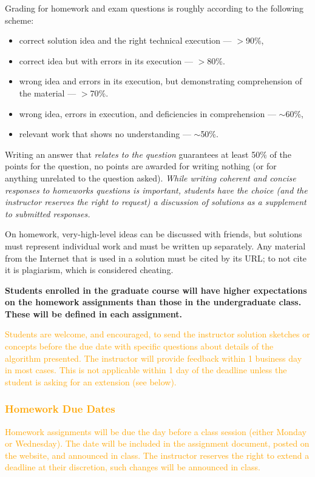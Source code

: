 \documentclass[12pt]{scrartcl}
\newcommand{\add}[1]{\textcolor{orange}{#1}}
\begin{document}
Grading for homework and exam questions is roughly according to the following scheme:
\begin{itemize}
\item correct solution idea and the right technical execution --- $>$90\%, 
\item correct idea but with errors in its execution --- $>$80\%. 
\item wrong idea and errors in its execution, but demonstrating comprehension of the material --- $>$70\%. 
\item wrong idea, errors in execution, and deficiencies in comprehension --- $\sim$60\%, 
\item relevant work that shows no understanding --- $\sim$50\%.
\end{itemize}
Writing an answer that \emph{relates to the question} guarantees at least 50\% of the points for the question, 
no points are awarded for writing nothing (or for anything unrelated to the question asked).
\emph{While writing coherent and concise responses to homeworks questions is important, 
students have the choice (and the instructor reserves the right to request) a discussion of solutions as a supplement to submitted responses. }

On homework, very-high-level ideas can be discussed with friends, but solutions must represent individual work and must be written up separately. 
Any material from the Internet that is used in a solution must be cited by its URL; to not cite it is plagiarism, which is considered cheating.

\textbf{Students enrolled in the graduate course will have higher expectations on the homework assignments than those in the undergraduate class. 
These will be defined in each assignment. }

\add{Students are welcome, and encouraged, to send the instructor solution sketches or concepts before the due date with specific questions about details of the algorithm presented.
The instructor will provide feedback within 1 business day in most cases. 
This is not applicable within 1 day of the deadline unless the student is asking for an extension (see below).}

\subsubsection{\add{Homework Due Dates}}

\add{
Homework assignments will be due the day before a class session (either Monday or Wednesday).
The date will be included in the assignment document, posted on the website, and announced in class. 
The instructor reserves the right to extend a deadline at their discretion, such changes will be announced in class.}
\end{document}

